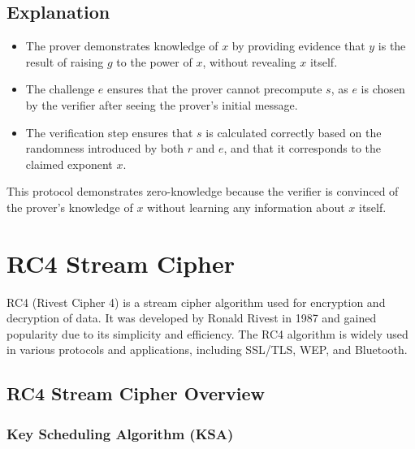 \documentclass[11pt]{article}
\begin{document}
\subsection{Explanation}
\begin{itemize}
    \item The prover demonstrates knowledge of $x$ by providing evidence that $y$ is the result of raising $g$ to the power of $x$, without revealing $x$ itself.
    \item The challenge $e$ ensures that the prover cannot precompute $s$, as $e$ is chosen by the verifier after seeing the prover's initial message.
    \item The verification step ensures that $s$ is calculated correctly based on the randomness introduced by both $r$ and $e$, and that it corresponds to the claimed exponent $x$.
\end{itemize}

This protocol demonstrates zero-knowledge because the verifier is convinced of the prover's knowledge of $x$ without learning any information about $x$ itself.

\section{RC4 Stream Cipher}

RC4 (Rivest Cipher 4) is a stream cipher algorithm used for encryption and decryption of data. It was developed by Ronald Rivest in 1987 and gained popularity due to its simplicity and efficiency. The RC4 algorithm is widely used in various protocols and applications, including SSL/TLS, WEP, and Bluetooth.

\subsection{RC4 Stream Cipher Overview}

\subsubsection{Key Scheduling Algorithm (KSA)}
\end{document}
